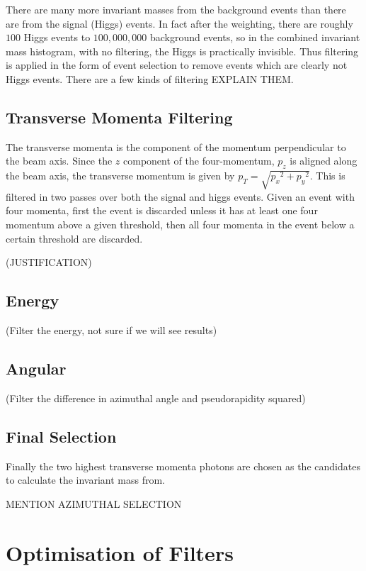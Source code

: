 \documentclass[11pt]{amsart}
\begin{document}
\begin{multicols}{2}
There are many more invariant masses from the background events than there are from the signal (Higgs) events. In fact after the weighting, there are roughly $100$ Higgs events to $100,000,000$ background events, so in the combined invariant mass histogram, with no filtering, the Higgs is practically invisible. Thus filtering is applied in the form of event selection to remove events which are clearly not Higgs events. There are a few kinds of filtering EXPLAIN THEM.

\subsection{Transverse Momenta Filtering}

The transverse momenta is the component of the momentum perpendicular to the beam axis. Since the $z$ component of the four-momentum, $p_z$ is aligned along the beam axis, the transverse momentum is given by $p_T = \sqrt{{p_x}^2 + {p_y}^2}$. This is filtered in two passes over both the signal and higgs events. Given an event with four momenta, first the event is discarded unless it has at least one four momentum above a given threshold, then all four momenta in the event below a certain threshold are discarded.

(JUSTIFICATION)

\subsection{Energy}

(Filter the energy, not sure if we will see results)

\subsection{Angular}

(Filter the difference in azimuthal angle and pseudorapidity squared)

\subsection{Final Selection}

Finally the two highest transverse momenta photons are chosen as the candidates to calculate the invariant mass from.

MENTION AZIMUTHAL SELECTION


\section{Optimisation of Filters}


\end{multicols}
\end{document}
